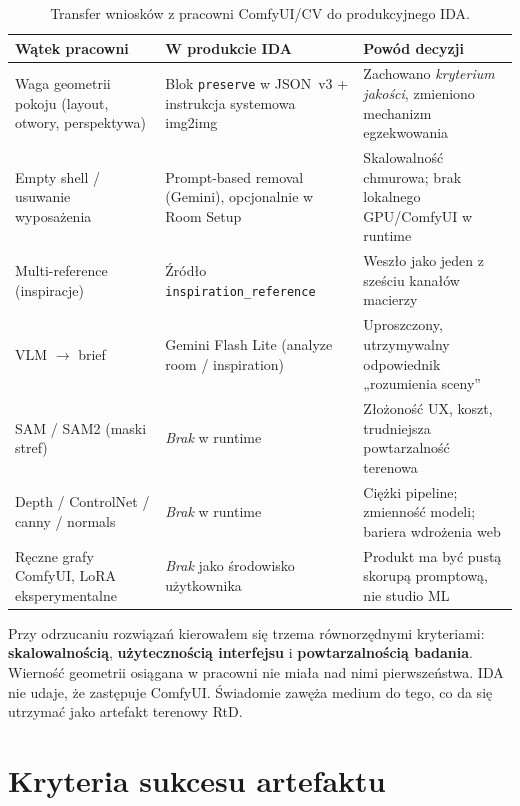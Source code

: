 \begin{table}[htbp]
  \centering
  \caption{Transfer wniosków z pracowni ComfyUI/CV do produkcyjnego IDA.}
  \label{tab:ch07:comfyui-transfer}
  \begin{tabular}{@{}p{}p{}p{}@{}}
    \toprule
    Wątek pracowni & W produkcie IDA & Powód decyzji \\
    \midrule
    Waga geometrii pokoju (layout, otwory, perspektywa) &
    Blok \texttt{preserve} w JSON~v3 + instrukcja systemowa img2img &
    Zachowano \emph{kryterium jakości}, zmieniono mechanizm egzekwowania \\
    \addlinespace
    Empty shell / usuwanie wyposażenia &
    Prompt-based removal (Gemini), opcjonalnie w Room Setup &
    Skalowalność chmurowa; brak lokalnego GPU/ComfyUI w runtime \\
    \addlinespace
    Multi-reference (inspiracje) &
    Źródło \texttt{inspiration\_reference} &
    Weszło jako jeden z sześciu kanałów macierzy \\
    \addlinespace
    VLM $\rightarrow$ brief &
    Gemini Flash Lite (analyze room / inspiration) &
    Uproszczony, utrzymywalny odpowiednik „rozumienia sceny” \\
    \addlinespace
    SAM / SAM2 (maski stref) &
    \emph{Brak} w runtime &
    Złożoność UX, koszt, trudniejsza powtarzalność terenowa \\
    \addlinespace
    Depth / ControlNet / canny / normals &
    \emph{Brak} w runtime &
    Ciężki pipeline; zmienność modeli; bariera wdrożenia web \\
    \addlinespace
    Ręczne grafy ComfyUI, LoRA eksperymentalne &
    \emph{Brak} jako środowisko użytkownika &
    Produkt ma być pustą skorupą promptową, nie studio ML \\
    \bottomrule
  \end{tabular}
\end{table}

Przy odrzucaniu rozwiązań kierowałem się trzema równorzędnymi kryteriami: \textbf{skalowalnością}, \textbf{użytecznością interfejsu} i \textbf{powtarzalnością badania}. Wierność geometrii osiągana w pracowni nie miała nad nimi pierwszeństwa. IDA nie udaje, że zastępuje ComfyUI. Świadomie zawęża medium do tego, co da się utrzymać jako artefakt terenowy RtD.

\section{Kryteria sukcesu artefaktu}
\label{ch07:sec:kryteria}

